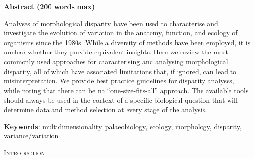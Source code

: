 \documentclass[12pt,letterpaper]{article}
\renewcommand{\section}[1]{%
\bigskip
\begin{center}
\begin{Large}
\normalfont\scshape #1
\medskip
\end{Large}
\end{center}}
\begin{document}
\textbf{Abstract (200 words max)}

\noindent Analyses of morphological disparity have been used to characterise and investigate the evolution of variation in the anatomy, function, and ecology of organisms since the 1980s.
While a diversity of methods have been employed, it is unclear whether they provide
equivalent insights.
Here we review the most commonly used approaches for characterising and analysing morphological disparity, all of which have associated limitations that, if ignored, can lead to misinterpretation.
We provide best practice guidelines for disparity analyses, while noting that there can be no ``one-size-fits-all'' approach.
The available tools should always be used in the context of a specific biological question that will determine data and method selection at every stage of the analysis.

\textbf{Keywords}: multidimensionality, palaeobiology, ecology,
morphology, disparity, variance/variation

\section{Introduction}

\end{document}
